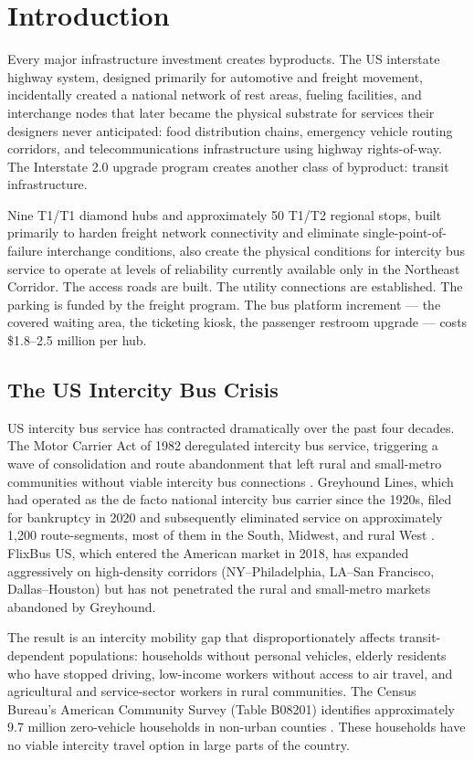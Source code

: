 \section{Introduction}

Every major infrastructure investment creates byproducts. The US interstate highway system, designed primarily for automotive and freight movement, incidentally created a national network of rest areas, fueling facilities, and interchange nodes that later became the physical substrate for services their designers never anticipated: food distribution chains, emergency vehicle routing corridors, and telecommunications infrastructure using highway rights-of-way. The Interstate 2.0 upgrade program creates another class of byproduct: transit infrastructure.

Nine T1/T1 diamond hubs and approximately 50 T1/T2 regional stops, built primarily to harden freight network connectivity and eliminate single-point-of-failure interchange conditions, also create the physical conditions for intercity bus service to operate at levels of reliability currently available only in the Northeast Corridor. The access roads are built. The utility connections are established. The parking is funded by the freight program. The bus platform increment --- the covered waiting area, the ticketing kiosk, the passenger restroom upgrade --- costs \$1.8--2.5 million per hub.

\subsection{The US Intercity Bus Crisis}

US intercity bus service has contracted dramatically over the past four decades. The Motor Carrier Act of 1982 deregulated intercity bus service, triggering a wave of consolidation and route abandonment that left rural and small-metro communities without viable intercity bus connections \citep{Pisarski2006}. Greyhound Lines, which had operated as the de facto national intercity bus carrier since the 1920s, filed for bankruptcy in 2020 and subsequently eliminated service on approximately 1,200 route-segments, most of them in the South, Midwest, and rural West \citep{Amtrak2023}. FlixBus US, which entered the American market in 2018, has expanded aggressively on high-density corridors (NY--Philadelphia, LA--San Francisco, Dallas--Houston) but has not penetrated the rural and small-metro markets abandoned by Greyhound.

The result is an intercity mobility gap that disproportionately affects transit-dependent populations: households without personal vehicles, elderly residents who have stopped driving, low-income workers without access to air travel, and agricultural and service-sector workers in rural communities. The Census Bureau's American Community Survey (Table B08201) identifies approximately 9.7 million zero-vehicle households in non-urban counties \citep{ACS_B08201_2022}. These households have no viable intercity travel option in large parts of the country.

